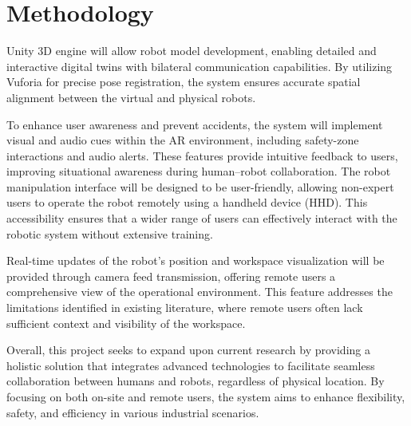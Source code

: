 \chapter{Methodology}%
\label{chapter:methodology}



Unity 3D engine will allow robot model development, enabling detailed and interactive digital twins with bilateral communication capabilities. By utilizing Vuforia for precise pose registration, the system ensures accurate spatial alignment between the virtual and physical robots.

To enhance user awareness and prevent accidents, the system will implement visual and audio cues within the \ac{AR} environment, including safety-zone interactions and audio alerts. These features provide intuitive feedback to users, improving situational awareness during human--robot collaboration. The robot manipulation interface will be designed to be user-friendly, allowing non-expert users to operate the robot remotely using a handheld device (\ac{HHD}). This accessibility ensures that a wider range of users can effectively interact with the robotic system without extensive training.

Real-time updates of the robot's position and workspace visualization will be provided through camera feed transmission, offering remote users a comprehensive view of the operational environment. This feature addresses the limitations identified in existing literature, where remote users often lack sufficient context and visibility of the workspace.


Overall, this project seeks to expand upon current research by providing a holistic solution that integrates advanced technologies to facilitate seamless collaboration between humans and robots, regardless of physical location. By focusing on both on-site and remote users, the system aims to enhance flexibility, safety, and efficiency in various industrial scenarios.




